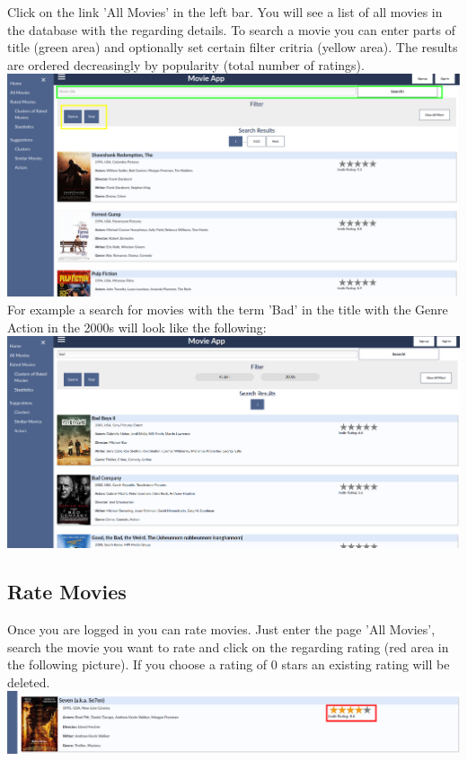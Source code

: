 \documentclass{article}
\begin{document}
Click on the link 'All Movies' in the left bar. You will see a list of all movies in the database with the regarding details.
To search a movie you can enter parts of title (green area) and optionally set certain filter critria (yellow area). The results are ordered decreasingly by popularity (total number of ratings).\\[2ex]
\includegraphics[scale=0.25]{screenshots_app/all_movies.png}\\

For example a search for movies with the term 'Bad' in the title with the Genre Action in the 2000s will look like the following:\\[2ex]
\includegraphics[scale=0.2]{screenshots_app/all_movies_ex1.png}\\


\subsection{Rate Movies}

Once you are logged in you can rate movies. Just enter the page 'All Movies', search the movie you want to rate and click on the regarding rating (red area in the following picture). If you choose a rating of 0 stars an existing rating will be deleted.\\[2ex]
\includegraphics[scale=0.3]{screenshots_app/rate_movie_ex1.png}\\
\end{document}
